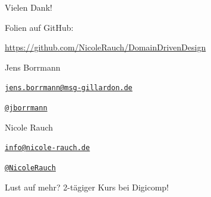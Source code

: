 {
\begin{frame}{Vielen Dank!}

        Folien auf GitHub:
        \vspace{-0.8em}
        \begin{center}
                \url{https://github.com/NicoleRauch/DomainDrivenDesign}
        \end{center}

        \begin{block}{Jens Borrmann}
        \begin{description}[Twitterxx]
                \item[E-Mail]  \href{mailto:jens.borrmann@msg-gillardon.de}{\texttt{jens.borrmann@msg-gillardon.de}}
                \item[Twitter] \href{http://twitter.com/jborrmann}{\texttt{@jborrmann}}
        \end{description}
        \end{block}
        \begin{block}{Nicole Rauch}
        \begin{description}[Twitterxx]
                \item[E-Mail]  \href{mailto:info@nicole-rauch.de}{\texttt{info@nicole-rauch.de}}
                \item[Twitter] \href{http://twitter.com/NicoleRauch}{\texttt{@NicoleRauch}}
        \end{description}
        \end{block}
        
        Lust auf mehr? 2-tägiger Kurs bei Digicomp!
\end{frame}
}
